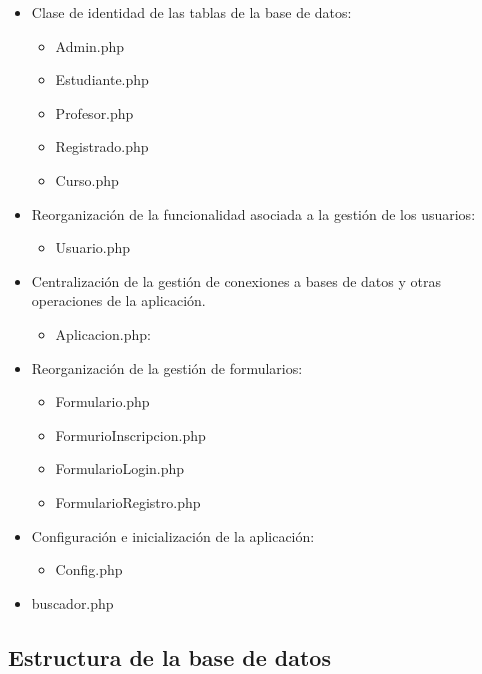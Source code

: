 \documentclass[
]{article}
\providecommand{\tightlist}{%
  \setlength{\itemsep}{0pt}\setlength{\parskip}{0pt}}
\begin{document}
\begin{itemize}
\item
  Clase de identidad de las tablas de la base de datos:

  \begin{itemize}
  \item
    Admin.php
  \item
    Estudiante.php
  \item
    Profesor.php
  \item
    Registrado.php
  \item
    Curso.php
  \end{itemize}
\item
  Reorganización de la funcionalidad asociada a la gestión de los
  usuarios:

  \begin{itemize}
  \tightlist
  \item
    Usuario.php
  \end{itemize}
\item
  Centralización de la gestión de conexiones a bases de datos y otras
  operaciones de la aplicación.

  \begin{itemize}
  \tightlist
  \item
    Aplicacion.php:
  \end{itemize}
\item
  Reorganización de la gestión de formularios:

  \begin{itemize}
  \item
    Formulario.php
  \item
    FormurioInscripcion.php
  \item
    FormularioLogin.php
  \item
    FormularioRegistro.php
  \end{itemize}
\item
  Configuración e inicialización de la aplicación:

  \begin{itemize}
  \tightlist
  \item
    Config.php
  \end{itemize}
\item
  buscador.php
\end{itemize}

\newpage

\subsection{Estructura de la base de
datos}\label{estructura-de-la-base-de-datos}
\end{document}
